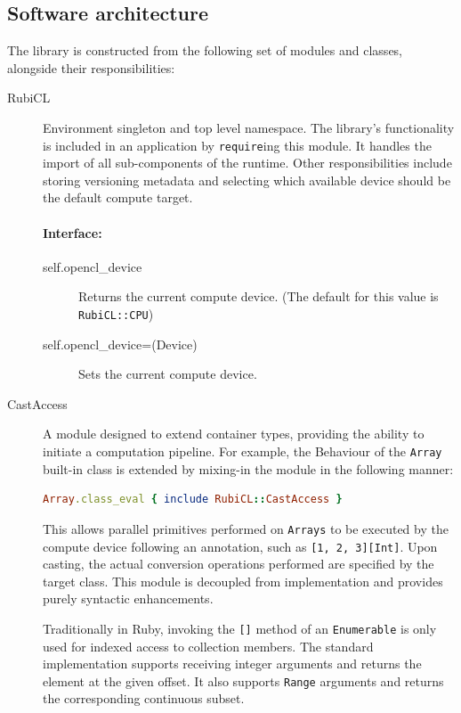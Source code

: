 \subsection{Software architecture}
The library is constructed from the following set of modules and classes, alongside their responsibilities:
\begin{description}
  \item[RubiCL] Environment singleton and top level namespace.
The library's functionality is included in an application by \verb|require|ing this module. It handles the import of all sub-components of the runtime.
Other responsibilities include storing versioning metadata and selecting which available device should be the default compute target.

\paragraph*{Interface:}
\begin{description}
  \item[self.opencl\_device] Returns the current compute device. (The default for this value is \verb|RubiCL::CPU|)
  \item[self.opencl\_device=(Device)] Sets the current compute device.
\end{description}

  \item[CastAccess] A module designed to extend container types, providing the ability to initiate a computation pipeline.
    For example, the Behaviour of the \verb|Array| built-in class is extended by mixing-in the module in the following manner:
\begin{lstlisting}[language=Ruby]
Array.class_eval { include RubiCL::CastAccess }
\end{lstlisting}
This allows parallel primitives performed on \verb|Arrays| to be executed by the compute device following an annotation, such as \verb|[1, 2, 3][Int]|.
Upon casting, the actual conversion operations performed are specified by the target class. This module is decoupled from implementation and provides purely syntactic enhancements.

Traditionally in Ruby, invoking the \verb|[]| method of an \verb|Enumerable| is only used for indexed access to collection members. The standard implementation supports receiving integer arguments and returns the element at the given offset. It also supports \verb|Range| arguments and returns the corresponding continuous subset.


\end{description}

